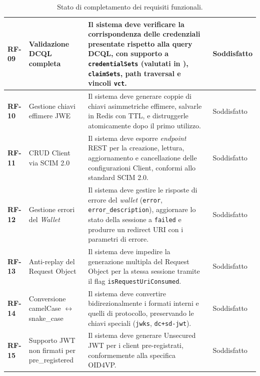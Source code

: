 \begin{table}[hbt!]
{\begin{tabular}{l p{4cm} p{8cm} l}
\hline
\textbf{RF-09} & Validazione DCQL completa & Il sistema deve verificare la corrispondenza delle credenziali presentate rispetto alla query DCQL, con supporto a \texttt{credentialSets} (valutati in ), \texttt{claimSets}, path traversal e vincoli \texttt{vct}. & Soddisfatto \\
\hline
\textbf{RF-10} & Gestione chiavi effimere JWE & Il sistema deve generare coppie di chiavi asimmetriche effimere, salvarle in Redis con TTL, e distruggerle atomicamente dopo il primo utilizzo. & Soddisfatto \\
\hline
\textbf{RF-11} & CRUD\glsadd{crudg} Client via SCIM\glsadd{scimg} 2.0 & Il sistema deve esporre \textit{endpoint} REST\glsadd{rest} per la creazione, lettura, aggiornamento e cancellazione delle configurazioni Client, conformi allo standard SCIM 2.0. & Soddisfatto \\
\hline
\textbf{RF-12} & Gestione errori del \textit{Wallet} & Il sistema deve gestire le risposte di errore del \textit{wallet} (\texttt{error}, \texttt{error\_\allowbreak{}description}), aggiornare lo stato della sessione a \texttt{failed} e produrre un redirect URI con i parametri di errore. & Soddisfatto \\
\hline
\textbf{RF-13} & Anti-replay del Request Object & Il sistema deve impedire la generazione multipla del Request Object per la stessa sessione tramite il flag \texttt{isRequestUriConsumed}. & Soddisfatto \\
\hline
\textbf{RF-14} & Conversione camelCase \(\leftrightarrow\) snake\_case & Il sistema deve convertire bidirezionalmente i formati interni e quelli di protocollo, preservando le chiavi speciali (\texttt{jwks}, \texttt{dc+sd-\allowbreak{}jwt}). & Soddisfatto \\
\hline
\textbf{RF-15} & Supporto JWT non firmati per pre\_registered & Il sistema deve generare Unsecured JWT per i client pre-registrati, conformemente alla specifica OID4VP. & Soddisfatto \\
\bottomrule
\end{tabular}
}
\caption{Stato di completamento dei requisiti funzionali.}
\label{tab:requisiti_funzionali_final}
\end{table}

